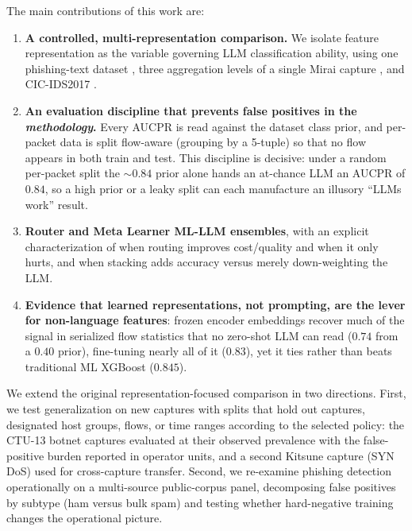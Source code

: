 \documentclass{jmlr}
\begin{document}
The main contributions of this work are:
\begin{enumerate}
\item \textbf{A controlled, multi-representation comparison.} We isolate feature representation as the
   variable governing LLM classification ability, using one phishing-text dataset \citep{liu2023phishing}, three aggregation
   levels of a single Mirai capture \citep{mirsky2018kitsune}, and CIC-IDS2017 \citep{sharafaldin2018cicids}.
\item \textbf{An evaluation discipline that prevents false positives in the \emph{methodology}.} Every AUCPR \citep{davis2006relationship} is
   read against the dataset class prior, and per-packet data is split flow-aware (grouping by a
   5-tuple) so that no flow appears in both train and test. This discipline is decisive: under a
   random per-packet split the ${\sim}0.84$ prior alone hands an at-chance LLM an AUCPR of $0.84$, so a
   high prior or a leaky split can each manufacture an illusory ``LLMs work'' result.
\item \textbf{Router and Meta Learner ML-LLM ensembles}, with an explicit characterization of when routing
   improves cost/quality and when it only hurts, and when stacking adds accuracy versus merely down-weighting the LLM.
\item \textbf{Evidence that learned representations, not prompting, are the lever for non-language features}: frozen encoder embeddings recover much of the signal in serialized flow statistics that no zero-shot LLM can read ($0.74$ from a $0.40$ prior), fine-tuning nearly all of it ($0.83$), yet it ties rather than beats traditional ML XGBoost ($0.845$).
\end{enumerate}

We extend the original representation-focused comparison in two directions. First, we test generalization on new captures with splits that hold out captures, designated host groups, flows, or time ranges according to the selected policy: the CTU-13 botnet captures \citep{garcia2014empirical} evaluated at their observed prevalence with the false-positive burden reported in operator units, and a second Kitsune capture (SYN DoS) used for cross-capture transfer. Second, we re-examine phishing detection operationally on a multi-source public-corpus panel, decomposing false positives by subtype (ham versus bulk spam) and testing whether hard-negative training changes the operational picture.
\end{document}
